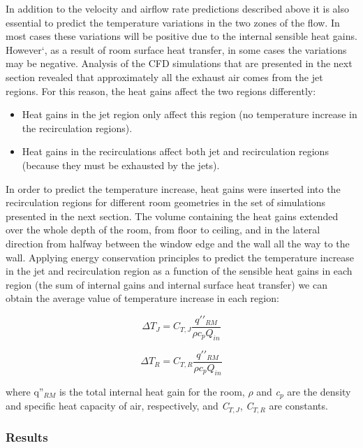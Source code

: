 {In addition to the velocity and airflow rate predictions described above it is also essential to predict the temperature variations in the two zones of the flow. In most cases these variations will be positive due to the internal sensible heat gains. However`, as a result of room surface heat transfer, in some cases the variations may be negative. Analysis of the CFD simulations that are presented in the next section revealed that approximately all the exhaust air comes from the jet regions. For this reason, the heat gains affect the two regions differently:

\begin{itemize}
\item Heat gains in the jet region only affect this region (no temperature increase in the recirculation regions).
\item Heat gains in the recirculations affect both jet and recirculation regions (because they must be exhausted by the jets).
\end{itemize}

In order to predict the temperature increase, heat gains were inserted into the recirculation regions for different room geometries in the set of simulations presented in the next section. The volume containing the heat gains extended over the whole depth of the room, from floor to ceiling, and in the lateral direction from halfway between the window edge and the wall all the way to the wall. Applying energy conservation principles to predict the temperature increase in the jet and recirculation region as a function of the sensible heat gains in each region (the sum of internal gains and internal surface heat transfer) we can obtain the average value of temperature increase in each region:

\begin{equation}
\Delta {T_J} = {C_{T,J}}\frac{{q'{'_{RM}}}}{{\rho {c_p}{Q_{in}}}}
\end{equation}

\begin{equation}
\Delta {T_R} = {C_{T,R}}\frac{{q'{'_{RM}}}}{{\rho {c_p}{Q_{in}}}}
\end{equation}

where q''\(_{RM}\) is the total internal heat gain for the room, \(\rho\) and \emph{c}\(_{p}\) are the density and specific heat capacity of air, respectively, and \emph{C}\(_{T,J}\), \emph{C}\(_{T,R}\) are constants.

\subsubsection{Results}\label{results}

}
